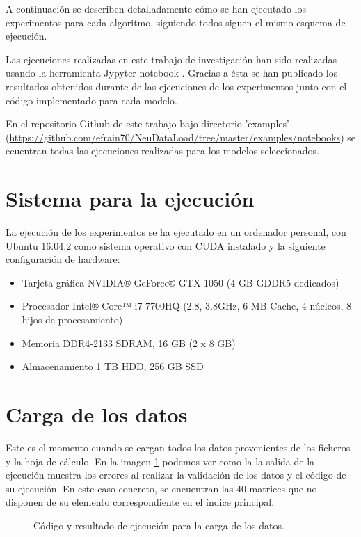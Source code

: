 A continuación se describen detalladamente cómo se han ejecutado los experimentos para cada algoritmo, siguiendo todos siguen el mismo esquema de ejecución.

Las ejecuciones realizadas en este trabajo de investigación han sido realizadas usando la herramienta Jypyter notebook \cite{ProjectHome}. Gracias a ésta se han publicado los resultados obtenidos durante de las ejecuciones de los experimentos  junto con el código implementado para cada modelo. 

En el repositorio Github de este trabajo bajo directorio 'examples' (\url{https://github.com/efrain70/NeuDataLoad/tree/master/examples/notebooks}) se ecuentran todas las ejecuciones realizadas para los modelos seleccionados.

\section{Sistema para la ejecución}
La ejecución de los experimentos se ha ejecutado en un ordenador personal, con Ubuntu 16.04.2 como sistema operativo con CUDA \cite{ProcesamientoNVIDIA} instalado y la siguiente configuración de hardware:
\begin{itemize}
    \item Tarjeta gráfica NVIDIA® GeForce® GTX 1050 (4 GB GDDR5 dedicados)
    \item Procesador Intel® Core™ i7-7700HQ (2.8, 3.8GHz, 6 MB Cache, 4 núcleos, 8 hijos de procesamiento)
    \item Memoria DDR4-2133 SDRAM, 16 GB (2 x 8 GB)
    \item Almacenamiento 1 TB HDD,  256 GB SSD
\end{itemize}

\section{Carga de los datos}
Este es el momento cuando se cargan todos los datos provenientes de los ficheros y la hoja de cálculo. En la imagen \ref{figure:codeload} podemos ver como la la salida de la ejecución muestra los errores al realizar la validación de los datos y el código de su ejecución. En este caso concreto, se encuentran las 40 matrices que no disponen de su elemento correspondiente en el índice principal.

\begin{figure}[H]
\centering
{}
\caption{Código y resultado de ejecución para la carga de los datos.}
\label{figure:codeload}
\end{figure}


